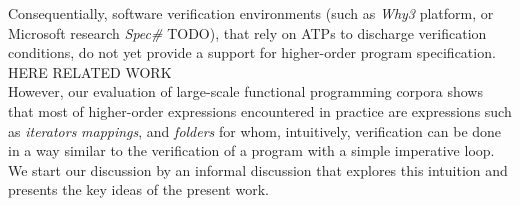 \documentclass[a4paper,11pt,oneside]{article}
\theoremstyle{plain}
\begin{document}
	Consequentially, software verification environments (such as \textit{Why3} platform, or Microsoft research \textit{Spec\#} TODO), that rely on ATPs to discharge verification conditions, do not yet provide a support for higher-order program specification. \\

%
%
%	
%	

  HERE RELATED WORK \\

  However, our evaluation of large-scale functional programming corpora shows that most of higher-order expressions encountered in practice are expressions such as \textit{iterators} \textit{mappings}, and \textit{folders} for whom, intuitively, verification can be done in a way similar to the verification of a program with a simple imperative loop.
  We start our discussion by an informal discussion that explores this intuition and presents the key ideas of the present work. 
  

%	

	

\end{document}
